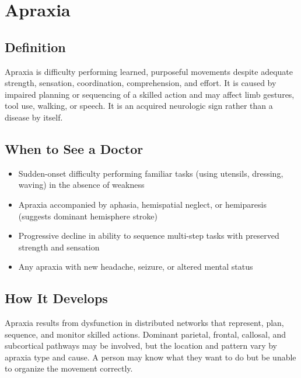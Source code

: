 \chapter{Apraxia}

\section*{Definition}
Apraxia is difficulty performing learned, purposeful movements despite adequate strength, sensation, coordination, comprehension, and effort. It is caused by impaired planning or sequencing of a skilled action and may affect limb gestures, tool use, walking, or speech. It is an acquired neurologic sign rather than a disease by itself.

\section*{When to See a Doctor}

\begin{itemize}
 \item Sudden-onset difficulty performing familiar tasks (using utensils, dressing, waving) in the absence of weakness
 \item Apraxia accompanied by aphasia, hemispatial neglect, or hemiparesis (suggests dominant hemisphere stroke)
 \item Progressive decline in ability to sequence multi-step tasks with preserved strength and sensation
 \item Any apraxia with new headache, seizure, or altered mental status
\end{itemize}

\section*{How It Develops}
Apraxia results from dysfunction in distributed networks that represent, plan, sequence, and monitor skilled actions. Dominant parietal, frontal, callosal, and subcortical pathways may be involved, but the location and pattern vary by apraxia type and cause. A person may know what they want to do but be unable to organize the movement correctly.

